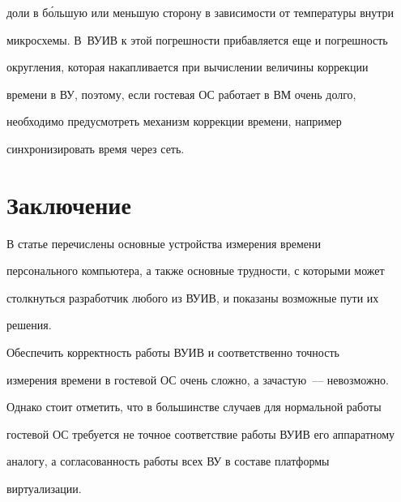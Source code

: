 доли в б\'{о}льшую или меньшую сторону в зависимости от температуры внутри 


микросхемы. В~ВУИВ к этой погрешности прибавляется еще и погрешность 


округления, которая накапливается при вычислении величины коррекции 


времени в ВУ, поэтому, если гостевая ОС работает в ВМ очень долго, 


необходимо предусмотреть механизм коррекции времени, например


синхронизировать время через сеть.





\section{Заключение}





     В статье перечислены основные устройства измерения времени 


персонального компьютера, а также основные трудности, с которыми может 


столкнуться разработчик любого из ВУИВ, и показаны возможные пути их 


решения.


     


     Обеспечить корректность работы ВУИВ и соответственно точность 


измерения времени в гостевой ОС очень сложно, а зачастую~--- невозможно. 


Однако стоит отметить, что в большинстве случаев для нормальной работы 


гостевой ОС требуется не точное соответствие работы ВУИВ его аппаратному 


аналогу, а согласованность работы всех ВУ в составе платформы 


виртуализации. 





